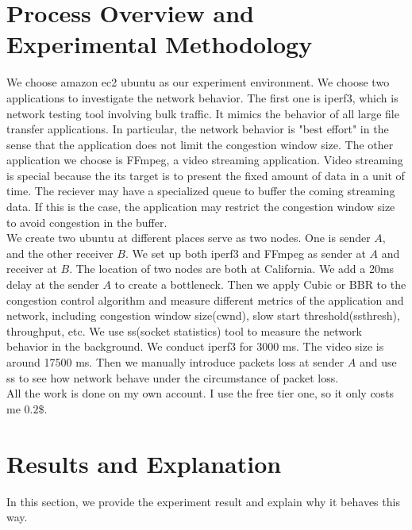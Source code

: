 \documentclass{article}
\begin{document}
\section{Process Overview and Experimental Methodology}
We choose amazon ec2 ubuntu as our experiment environment. We choose two applications to investigate the network behavior. The first one is iperf3, which is network testing tool involving bulk traffic.
It mimics the behavior of all large file transfer applications. In particular, the network behavior is "best effort" in the sense that the application does not limit the congestion window size. The other
application we choose is FFmpeg, a video streaming application. Video streaming is special because the its target is to present the fixed amount of data in a unit of time. The reciever may have a specialized queue to buffer
the coming streaming data. If this is the case, the application may restrict the congestion window size to avoid congestion in the buffer.
\\[6pt]
We create two ubuntu at different places serve as two nodes. One is sender $A$, and the other receiver $B$. We set up both iperf3 and FFmpeg as sender at $A$ and receiver at $B$. The location of two nodes are both at California.
We add a 20ms delay at the sender $A$ to create a bottleneck. Then we apply Cubic or BBR to the congestion control algorithm and measure different metrics of the application and network, including congestion window size(cwnd),
slow start threshold(ssthresh), throughput, etc. We use ss(socket statistics) tool to measure the network behavior in the background. We conduct iperf3 for 3000 ms. The video size is around 17500 ms. Then we manually introduce packets loss at sender $A$ and use ss to see how network behave under
the circumstance of packet loss.
\\[6pt]
All the work is done on my own account. I use the free tier one, so it only costs me $0.2$\$.

\section{Results and Explanation}
In this section, we provide the experiment result and explain why it behaves this way. 
\end{document}
